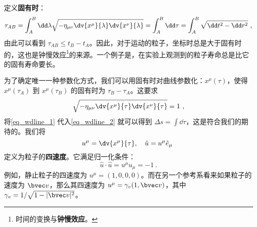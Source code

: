 定义\textbf{固有时}：
\begin{equation}
\tau_{AB}=\int_{A}^{B} \dd\lambda \sqrt{-\eta_{\mu\nu}\dv{x^\mu}{\lambda} \dv{x^\nu}{\lambda}}=\int_A^B \dd \tau = \int_A^B \sqrt{\dd t^2-\dd r^2}~,
\end{equation}
由此可以看到 $\tau_{AB}\le t_B-t_A$。因此，对于运动的粒子，坐标时总是大于固有时的，这也是钟慢效应\footnote{时间的变换与\textbf{钟慢效应}。}的来源。一个例子是，在实验上观测到的粒子寿命总是比它的固有寿命要长。

为了确定唯一一种参数化方式，我们可以用固有时对曲线参数化：$x^\mu(\tau)$，使得 $x^\mu(\tau_A)$ 到 $x^\mu(\tau_B)$ 的固有时为 $\tau_B-\tau_A$。这要求
\begin{equation}\label{eq_wdline_1}
\sqrt{-\eta_{\mu\nu}\dv{x^\mu}{\tau} \dv{x^\nu}{\tau}}=1~,
\end{equation}
将\autoref{eq_wdline_1} 代入\autoref{eq_wdline_2} 就可以得到 $\Delta s=\int \dd \tau$，这是符合我们的期待的。我们将
\begin{equation}
u^\mu=\dv{x^\mu}{\tau},\quad \hat u=u^\mu \hat{e}_\mu~
\end{equation}
定义为粒子的\textbf{四速度}。它满足归一化条件：
\begin{equation}
\hat u \cdot \hat u = u^\mu u_\mu = -1~.
\end{equation}
例如，静止粒子的四速度为 $u^\mu=(1,0,0,0)$。而在另一个参考系看来如果粒子的速度为 $\bvec v$，那么其四速度为 $u^\mu=\gamma_v(1,\bvec v)$，其中 $\gamma_v=1/\sqrt{1-|\bvec v|^2}$。
